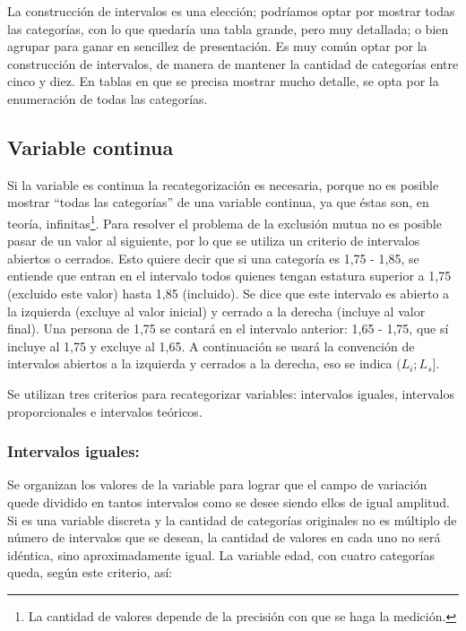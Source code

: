 \documentclass[]{book}
\let\rmarkdownfootnote\footnote%
\def\footnote{\protect\rmarkdownfootnote}
\begin{document}
La construcción de intervalos es una elección; podríamos optar por mostrar todas las categorías, con lo que quedaría una tabla grande, pero muy detallada; o bien agrupar para ganar en sencillez de presentación. Es muy común optar por la construcción de intervalos, de manera de mantener la cantidad de categorías entre cinco y diez. En tablas en que se precisa mostrar mucho detalle, se opta por la enumeración de todas las categorías.

\hypertarget{variable-continua}{%
\subsection{Variable continua}\label{variable-continua}}

Si la variable es continua la recategorización es necesaria, porque no es posible mostrar ``todas las categorías'' de una variable continua, ya que éstas son, en teoría, infinitas\footnote{La cantidad de valores depende de la precisión con que se haga la medición.}. Para resolver el problema de la exclusión mutua no es posible pasar de un valor al siguiente, por lo que se utiliza un criterio de intervalos abiertos o cerrados. Esto quiere decir que si una categoría es 1,75 - 1,85, se entiende que entran en el intervalo todos quienes tengan estatura superior a 1,75 (excluido este valor) hasta 1,85 (incluido). Se dice que este intervalo es abierto a la izquierda (excluye al valor inicial) y cerrado a la derecha (incluye al valor final). Una persona de 1,75 se contará en el intervalo anterior: 1,65 - 1,75, que sí incluye al 1,75 y excluye al 1,65. A continuación se usará la convención de intervalos abiertos a la izquierda y cerrados a la derecha, eso se indica \((L_i; L_s]\).

Se utilizan tres criterios para recategorizar variables: intervalos iguales, intervalos proporcionales e intervalos teóricos.

\hypertarget{intervalos-iguales}{%
\subsubsection{Intervalos iguales:}\label{intervalos-iguales}}

Se organizan los valores de la variable para lograr que el campo de variación quede dividido en tantos intervalos como se desee siendo ellos de igual amplitud. Si es una variable discreta y la cantidad de categorías originales no es múltiplo de número de intervalos que se desean, la cantidad de valores en cada uno no será idéntica, sino aproximadamente igual. La variable edad, con cuatro categorías queda, según este criterio, así:
\end{document}
